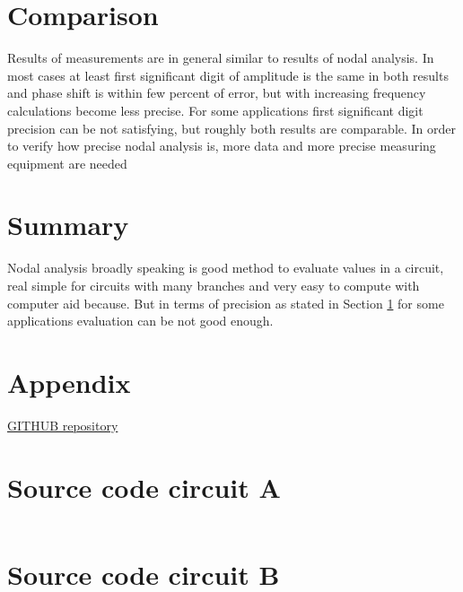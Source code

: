 \documentclass[notitlepage, a4paper, 11pt]{article}
\begin{document}
	\section{Comparison}\label{sec:comparison}
	Results of measurements are in general similar to results of nodal analysis. In most cases at least first significant digit of amplitude is the same in both results and phase shift is within few percent of error, but with increasing frequency calculations become less precise. For some applications first significant digit precision can be not satisfying, but roughly both results are comparable. In order to verify how precise nodal analysis is, more data and more precise measuring equipment are needed
	\section{Summary}
	Nodal analysis broadly speaking is good method to evaluate values in a circuit, real simple for circuits with many branches and very easy to compute with computer aid because. But in terms of precision as stated in Section \ref{sec:comparison} for some applications evaluation can be not good enough. 
	\newpage
	\appendix
	\section*{Appendix}\label{Appendix}
	\href{https://github.com/kamilix2003/CT-labs}{GITHUB repository}
	\section{Source code circuit A}
	\inputminted{python}{../CircuitA.py}
	\label{code:A}
	\newpage
	\section{Source code circuit B}
	\inputminted{python}{../CircuitB.py}
	\label{code:B}
\end{document}
